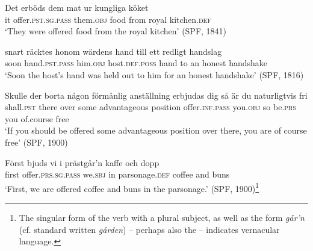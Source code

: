 \documentclass[output=paper]{langscibook}
\begin{document}
\ex\label{ex:falk:20c}
\gll Det  erböds          dem        mat    ur    kungliga    köket\\
      it      offer.\textsc{pst.sg.pass}    them.\textsc{obj}  food  from  royal      kitchen.\textsc{def}\\
\glt ‘They were offered food from the royal kitchen’ (SPF, 1841)

\ex\label{ex:falk:20d}
\gll snart  räcktes        honom    wärdens        hand  till   ett  redligt  handslag\\
      soon  hand\textsc{.pst.pass}  him\textsc{.obj}  host.\textsc{def.poss}   hand  to   an  honest   handshake\\
\glt ‘Soon the host’s hand was held out to him for an honest handshake’ (SPF, 1816)

\ex\label{ex:falk:20e}
\gll Skulle      der  borta  någon  förmånlig    anställning  erbjudas dig         så   är      du    naturligtvis    fri\\
shall.\textsc{pst}     there  over  some    advantageous  position     offer\textsc{.inf}.\textsc{pass}      you\textsc{.obj}   so  be.\textsc{prs}  you  of.course      free\\
\glt ‘If you should be offered some advantageous position over there, you are of         course free’ (SPF, 1900)

\ex\label{ex:falk:20f}
\gll Först  bjuds            vi      i  prästgår’n      kaffe    och  dopp\\
      first  offer\textsc{.prs}.\textsc{sg.pass}    we.\textsc{sbj}  in  parsonage\textsc{.def}  coffee  and  buns\\
\glt ‘First, we are offered coffee and buns in the parsonage.’ (SPF, 1900)\footnote{The singular form of the verb with a plural subject, as well as the form \textit{går’n} (cf. standard written \textit{gården}) – perhaps also the  – indicates vernacular language.}
\z
\z\largerpage
\end{document}
